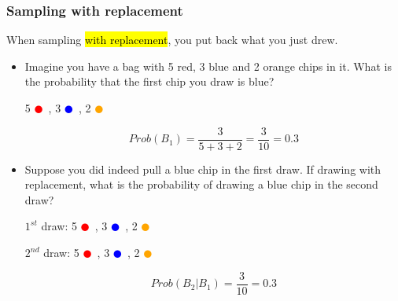 \documentclass[slidestop,compress,mathserif]{beamer}
\begin{document}
\begin{frame}
\frametitle{Sampling with replacement}

When sampling \hl{with replacement}, you put back what you just drew.

\pause

\begin{itemize}

\item Imagine you have a bag with 5 red, 3 blue and 2 orange chips in it. What is the probability that the first chip you draw is blue?
\begin{center}
5 \textcolor{red}{$\CIRCLE$}~, 3 \textcolor{blue}{$\CIRCLE$}~, 2 \textcolor{orange}{$\CIRCLE$}
\end{center}

\pause

\[ Prob(B_1) = \frac{3}{5 + 3 + 2} = \frac{3}{10} = 0.3 \]

\pause

\item Suppose you did indeed pull a blue chip in the first draw. If drawing with replacement, what is the probability of drawing a blue chip in the second draw?

\pause

\begin{center}
$1^{st}$ draw: 5 \textcolor{red}{$\CIRCLE$}~, 3 \textcolor{blue}{$\CIRCLE$}~, 2 \textcolor{orange}{$\CIRCLE$} \\

\pause

$2^{nd}$ draw: 5 \textcolor{red}{$\CIRCLE$}~, 3 \textcolor{blue}{$\CIRCLE$}~, 2 \textcolor{orange}{$\CIRCLE$}
\end{center}

\pause

\[ Prob(B_2 | B_1) = \frac{3}{10} = 0.3 \]

\end{itemize}

\end{frame}

\end{document}
